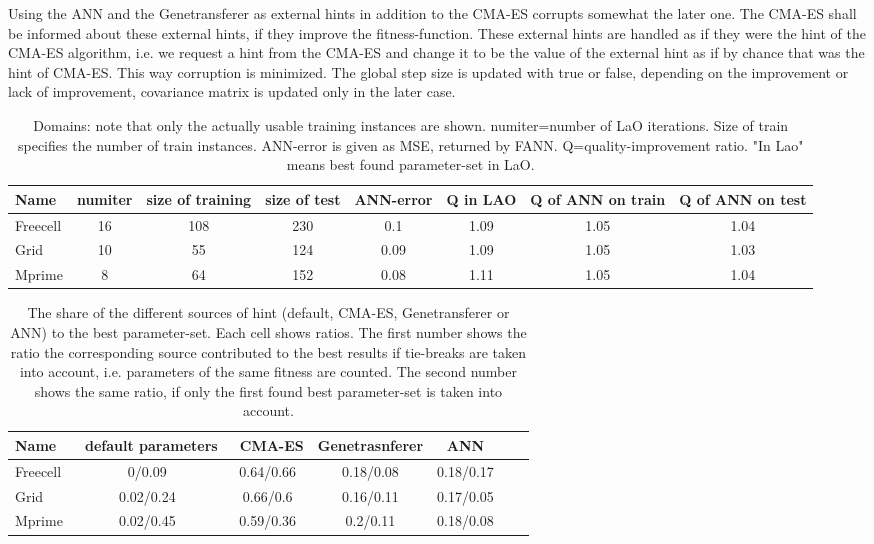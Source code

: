\documentclass{acm_proc_article-sp}
\begin{document}
Using the ANN and the Genetransferer as external hints in addition to the CMA-ES corrupts somewhat the later one. The CMA-ES shall be informed about these external hints, if they improve the fitness-function. These external hints are handled as if they were the hint of the CMA-ES algorithm, i.e. we request a hint from the CMA-ES and change it to be the value of the external hint as if by chance that was the hint of CMA-ES. This way corruption is minimized. The global step size is updated with true or false, depending on the improvement or lack of improvement, covariance matrix is updated only in the later case.

\begin{table*}[ht]
\centering
\begin{tabular}{l c c c c c c c}
\hline\hline
Name & numiter & size of training & size of test &  ANN-error & Q in LAO & Q of ANN on train & Q of ANN on test \\ 
\hline
Freecell& 16 & 108 & 230 & 0.1 & 1.09 & 1.05 & 1.04  \\
Grid & 10 & 55 & 124 & 0.09 & 1.09 & 1.05 & 1.03  \\
Mprime & 8 & 64 & 152 & 0.08 & 1.11 & 1.05 & 1.04   \\
\hline
\end{tabular}
\caption{Domains: note that only the actually usable training instances are shown. numiter=number of LaO iterations. Size of train specifies the number of train instances. ANN-error is given as MSE, returned by FANN. Q=quality-improvement ratio. "In Lao" means best found parameter-set in LaO.}
\label{table:domains}
\end{table*} 

 \begin{table*}[ht]
\centering
\begin{tabular}{l c c c c c c}
\hline\hline
Name & \ default parameters & \ CMA-ES &  Genetrasnferer & ANN \\ 
\hline
Freecell & 0/0.09& 0.64/0.66  & 0.18/0.08  & 0.18/0.17     \\
Grid & 0.02/0.24 & 0.66/0.6  & 0.16/0.11 & 0.17/0.05  &    \\
Mprime &  0.02/0.45& 0.59/0.36 & 0.2/0.11  & 0.18/0.08  &    \\
\hline
\end{tabular}
\caption{The share of the different sources of hint (default, CMA-ES, Genetransferer or ANN) to the best parameter-set. Each cell shows ratios. The first number shows the ratio the corresponding source contributed to the best results if tie-breaks are taken into account, i.e. parameters of the same fitness are counted. The second number shows the same ratio, if only the first found best parameter-set is taken into account.}
\label{table:hints}
\end{table*} 
\end{document}
